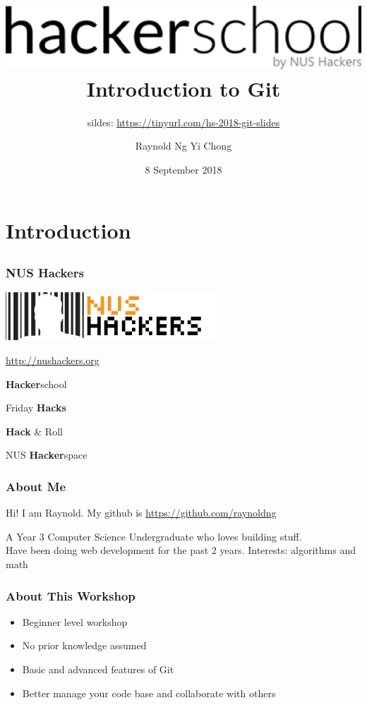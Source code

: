 \documentclass[12pt]{beamer}
\title{ \includegraphics[width=0.5\linewidth]{hackerschool} \\ Introduction  to Git}
\subtitle[Time to Git Gud]{sildes: \url{https://tinyurl.com/hs-2018-git-slides}}
\author{Raynold Ng Yi Chong}
\date{8 September 2018}
\begin{document}
\frame{\titlepage}

\section{Introduction}
\subsection{}

\begin{frame}
\frametitle{NUS Hackers}

\begin{center}	
\includegraphics[width=0.5\linewidth]{NUSHackers}

\url{http://nushackers.org}
\end{center}

\begin{center}
	\textbf{Hacker}school
	
	Friday \textbf{Hacks}
	
	\textbf{Hack} \& Roll
	
	NUS \textbf{Hacker}space
\end{center}

\end{frame}

\begin{frame}
\frametitle{About Me}

Hi! I am Raynold. My github is \url{https://github.com/raynoldng}

A Year 3 Computer Science Undergraduate who loves building stuff.\\

Have been doing web development for the past 2 years. Interests: algorithms and math

\end{frame}

\begin{frame}
\frametitle{About This Workshop}
\begin{itemize}
	\item Beginner level workshop
	\item No prior knowledge assumed
	\item Basic and advanced features of Git
	\item Better manage your code base and collaborate with others
\end{itemize}
\end{frame}
\end{document}
